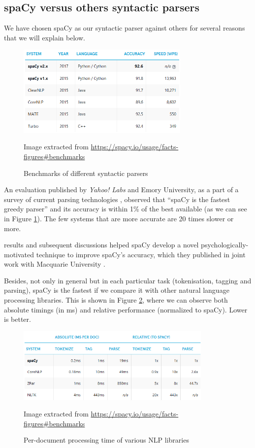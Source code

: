 \subsection{spaCy versus others syntactic parsers}

We have chosen spaCy as our syntactic parser against others for several reasons that we will explain below.

\begin{figure}[h]
	\centering%
	\includegraphics[width = 0.75\textwidth]{Imagenes/Bitmap/spacyeval.png}%
	\caption{Benchmarks of different syntactic parsers}%
	Image extracted from \url{https://spacy.io/usage/facts-figures#benchmarks}
	\label{fig:spacyeval}
\end{figure}

An evaluation published by \textit{Yahoo! Labs} and Emory University, as a part of a survey of current parsing technologies \citep{choi2015depends}, observed that ``spaCy is the fastest greedy parser'' and its accuracy is within 1\% of the best available (as we can see in Figure \ref{fig:spacyeval}). The few systems that are more accurate are 20 times slower or more.

\cite{choi2015depends} results and subsequent discussions helped spaCy develop a novel psychologically-motivated technique to improve spaCy's accuracy, which they published in joint work with Macquarie University \citep{honnibal2015improved}.

Besides, not only in general but in each particular task (tokenisation, tagging and parsing), spaCy is the fastest if we compare it with other natural language processing libraries. This is shown in Figure \ref{fig:spacyspeed}, where we can observe both absolute timings (in ms) and relative performance (normalized to spaCy). Lower is better.

\begin{figure}[h]
	\centering%
	\includegraphics[width = 0.85\textwidth]{Imagenes/Bitmap/spacyspeed.png}%
	\caption{Per-document processing time of various NLP libraries}%
	Image extracted from \url{https://spacy.io/usage/facts-figures#benchmarks}
	\label{fig:spacyspeed}
\end{figure}

